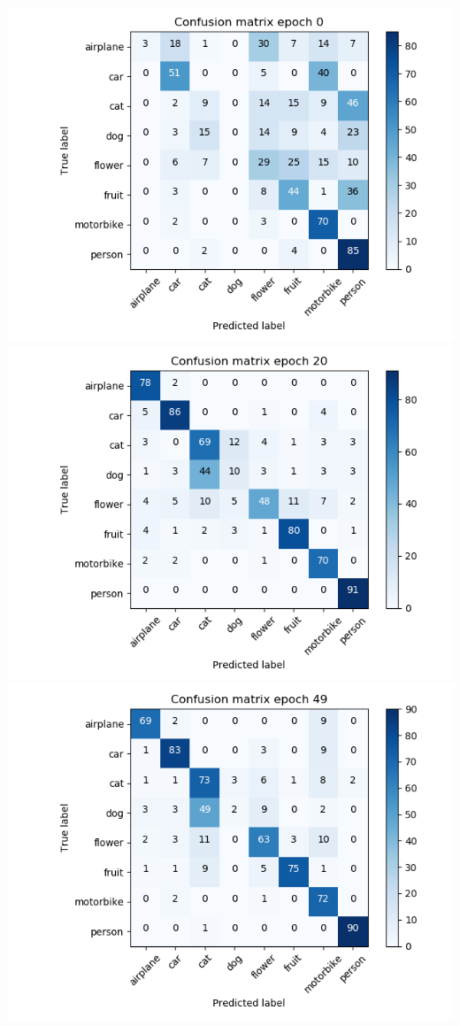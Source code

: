 \documentclass{article}
\begin{document}
\begin{minipage}[c]{\linewidth}
	\includegraphics[width=\figureWidth\textwidth]{./figures/cm_h64_w64_cp_none_e0.png}
	\includegraphics[width= \figureWidth\textwidth]{./figures/cm_h64_w64_cp_none_e20.png}
	\includegraphics[width= \figureWidth\textwidth]{./figures/cm_h64_w64_cp_none_e49.png}


\end{minipage}
\end{document}
